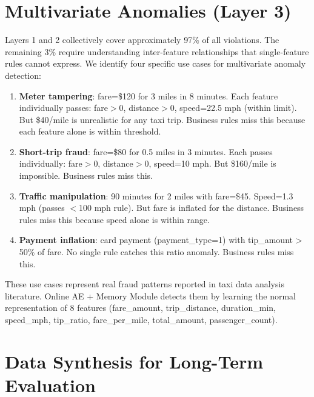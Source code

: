 \section{Multivariate Anomalies (Layer 3)}

Layers 1 and 2 collectively cover approximately 97\% of all violations. The remaining 3\% require understanding inter-feature relationships that single-feature rules cannot express. We identify four specific use cases for multivariate anomaly detection:

\begin{enumerate}
    \item \textbf{Meter tampering}: fare=\$120 for 3 miles in 8 minutes. Each feature individually passes: fare$>$0, distance$>$0, speed=22.5 mph (within limit). But \$40/mile is unrealistic for any taxi trip. Business rules miss this because each feature alone is within threshold.

    \item \textbf{Short-trip fraud}: fare=\$80 for 0.5 miles in 3 minutes. Each passes individually: fare$>$0, distance$>$0, speed=10 mph. But \$160/mile is impossible. Business rules miss this.

    \item \textbf{Traffic manipulation}: 90 minutes for 2 miles with fare=\$45. Speed=1.3 mph (passes $<$100 mph rule). But fare is inflated for the distance. Business rules miss this because speed alone is within range.

    \item \textbf{Payment inflation}: card payment (payment\_type=1) with tip\_amount > 50\% of fare. No single rule catches this ratio anomaly. Business rules miss this.
\end{enumerate}

These use cases represent real fraud patterns reported in taxi data analysis literature. Online AE + Memory Module detects them by learning the normal representation of 8 features (fare\_amount, trip\_distance, duration\_min, speed\_mph, tip\_ratio, fare\_per\_mile, total\_amount, passenger\_count).

\section{Data Synthesis for Long-Term Evaluation}


